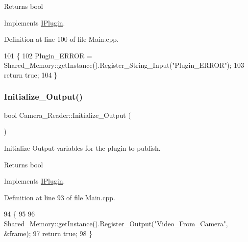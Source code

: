 \begin{DoxyReturn}{Returns}
bool 
\end{DoxyReturn}


Implements \hyperlink{class_i_plugin_aa7c66743ad956d8ada57becee559af4d}{I\+Plugin}.



Definition at line 100 of file Main.\+cpp.


\begin{DoxyCode}
101 \{
102     Plugin\_ERROR = Shared\_Memory::getInstance().Register\_String\_Input(\textcolor{stringliteral}{"Plugin\_ERROR"});
103     \textcolor{keywordflow}{return} \textcolor{keyword}{true};
104 \}
\end{DoxyCode}
\mbox{\label{class_camera___reader_a752286c32bea93608d0d23d1d4b3f0ed}} 
\subsubsection{\texorpdfstring{Initialize\+\_\+\+Output()}{Initialize\_Output()}}
{\footnotesize\ttfamily bool Camera\+\_\+\+Reader\+::\+Initialize\+\_\+\+Output (\begin{DoxyParamCaption}{ }\end{DoxyParamCaption})\hspace{0.3cm}{\ttfamily [virtual]}}



Initialize Output variables for the plugin to publish. 

\begin{DoxyReturn}{Returns}
bool 
\end{DoxyReturn}


Implements \hyperlink{class_i_plugin_a0b772513fc8c4ed01240e19c4bb84068}{I\+Plugin}.



Definition at line 93 of file Main.\+cpp.


\begin{DoxyCode}
94 \{   
95 
96     Shared\_Memory::getInstance().Register\_Output(\textcolor{stringliteral}{"Video\_From\_Camera"}, &frame);
97     \textcolor{keywordflow}{return} \textcolor{keyword}{true};
98 \}
\end{DoxyCode}
\mbox{\label{class_camera___reader_a63163ba2ecf2ff470ca7e6a31dcabfb6}} 
